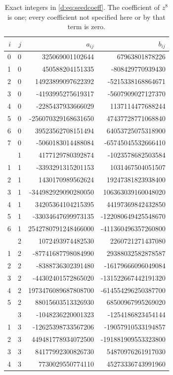 \documentclass[UTF8,11pt]{ctexart}
\theoremstyle{definition}
\numberwithin{equation}{section}
\begin{document}
\begin{table}[H]
\centering
\caption{Exact integers in \eqref{d:eq:seedcoeff}. The coefficient of $z^8$ is
one; every coefficient not specified here or by that term is zero.}
\label{d:tab:seed}
\small
\setlength{\tabcolsep}{8pt}
\begin{tabular}{rr@{\qquad}rr}
\toprule
$i$ & $j$ & $a_{ij}$ & $b_{ij}$\\
\midrule
0 & 0 & 325069001102644 & 67963801878226 \\
1 & 0 & 450588204151335 & -808429770939430 \\
2 & 0 & 14923899097622392 & -5215338168864671 \\
3 & 0 & -4193995275619317 & -5607909027127370 \\
4 & 0 & -2285437933666029 & 1137114477688244 \\
5 & 0 & -256070329168631650 & 47437728771068840 \\
6 & 0 & 39523562708151494 & 64053725075318900 \\
7 & 0 & -5060183014488084 & -65745045532666410 \\
\addlinespace[3pt]
0 & 1 & 4177129780392874 & -1023578682503584 \\
1 & 1 & -3393291315201153 & 1031467504051507 \\
2 & 1 & 1430170989562624 & 19247381823938400 \\
3 & 1 & -344982929090280050 & 106363039160048020 \\
4 & 1 & 34205364104215395 & 44197369842432850 \\
5 & 1 & -33034647699973135 & -122080649425548670 \\
6 & 1 & 2542780791248466000 & -411360496357260800 \\
\addlinespace[3pt]
0 & 2 & 1072493974482530 & 2260721271437080 \\
1 & 2 & -87741687798084990 & 29388032582878587 \\
2 & 2 & -8388736302391480 & -16179666096049084 \\
3 & 2 & -44302401572865020 & -131522667442191320 \\
4 & 2 & 1973476089687808700 & -614554296250387700 \\
5 & 2 & 88015603513326930 & 68500967995269020 \\
\addlinespace[3pt]
0 & 3 & -1048236220001323 & -1254186823454144 \\
1 & 3 & -12625398733567206 & -19057910533194857 \\
2 & 3 & 449481778934072500 & -191881909553323800 \\
3 & 3 & 84177992300826730 & 54870976261917030 \\
4 & 3 & 7730029550774110 & 45273336743991960 \\
\bottomrule
\end{tabular}
\end{table}
\end{document}
